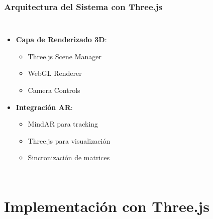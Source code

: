 \documentclass{beamer}
\begin{document}
\begin{frame}
\frametitle{Arquitectura del Sistema con Three.js}
\begin{columns}
\begin{itemize}
    \item<1-> \textbf{Capa de Renderizado 3D}:
    \begin{itemize}
        \item<2-> Three.js Scene Manager
        \item<3-> WebGL Renderer
        \item<4-> Camera Controls
    \end{itemize}
    \item<5-> \textbf{Integración AR}:
    \begin{itemize}
        \item<6-> MindAR para tracking
        \item<7-> Three.js para visualización
        \item<8-> Sincronización de matrices
    \end{itemize}
\end{itemize}

\end{columns}
\end{frame}

\section{Implementación con Three.js}
\end{document}
